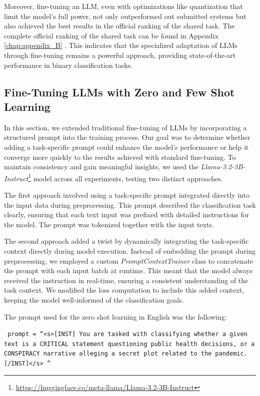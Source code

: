 \documentclass{Configuration_Files/PoliMi3i_thesis}
\begin{document}
Moreover, fine-tuning an LLM, even with optimizations like quantization that limit the model's full power, not only outperformed out submitted systems but also achieved the best results in the official ranking of the shared task. The complete official ranking of the shared task can be found in Appendix \ref{chap:appendix_B} \cite{korencic2024oppositional}. This indicates that the specialized adaptation of LLMs through fine-tuning remains a powerful approach, providing state-of-the-art performance in binary classification tasks.

\subsection{Fine-Tuning LLMs with Zero and Few Shot Learning}
In this section, we extended traditional fine-tuning of LLMs by incorporating a structured prompt into the training process. Our goal was to determine whether adding a task-specific prompt could enhance the model's performance or help it converge more quickly to the results achieved with standard fine-tuning. To maintain consistency and gain meaningful insights, we used the \textit{Llama-3.2-3B-Instruct}\footnote{\url{https://huggingface.co/meta-llama/Llama-3.2-3B-Instruct}} model across all experiments, testing two distinct approaches.

The first approach involved using a task-specific prompt integrated directly into the input data during preprocessing. This prompt described the classification task clearly, ensuring that each text input was prefixed with detailed instructions for the model. The prompt was tokenized together with the input texts.

The second approach added a twist by dynamically integrating the task-specific context directly during model execution. Instead of embedding the prompt during preprocessing, we employed a custom \textit{PromptContextTrainer} class to concatenate the prompt with each input batch at runtime. This meant that the model always received the instruction in real-time, ensuring a consistent understanding of the task context. We modified the loss computation to include this added context, keeping the model well-informed of the classification goals.

The prompt used for the zero shot learning in English was the following:
\begin{center}
\begin{flushleft}
\footnotesize
\texttt{
prompt = \textquotedblleft \mbox{<s>[INST]}
You are tasked with classifying whether a given text is a CRITICAL statement questioning public health decisions, or a CONSPIRACY narrative alleging a secret plot related to the pandemic.
\mbox{[/INST]</s>} \textquotedblright \\
}
\end{flushleft}
\end{center}
\end{document}
